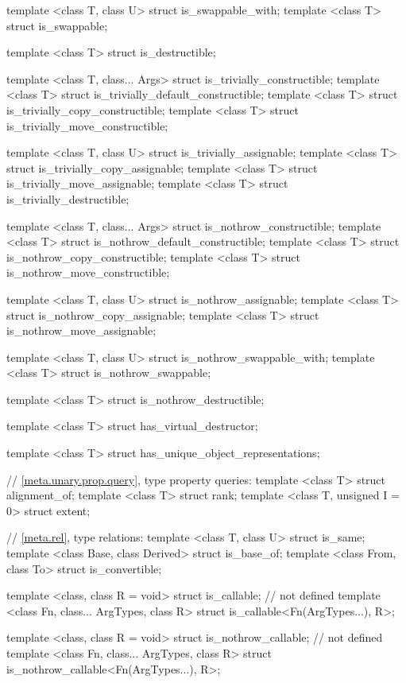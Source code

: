 \begin{codeblock}
{  template <class T, class U> struct is_swappable_with;
  template <class T> struct is_swappable;

  template <class T> struct is_destructible;

  template <class T, class... Args> struct is_trivially_constructible;
  template <class T> struct is_trivially_default_constructible;
  template <class T> struct is_trivially_copy_constructible;
  template <class T> struct is_trivially_move_constructible;

  template <class T, class U> struct is_trivially_assignable;
  template <class T> struct is_trivially_copy_assignable;
  template <class T> struct is_trivially_move_assignable;
  template <class T> struct is_trivially_destructible;

  template <class T, class... Args> struct is_nothrow_constructible;
  template <class T> struct is_nothrow_default_constructible;
  template <class T> struct is_nothrow_copy_constructible;
  template <class T> struct is_nothrow_move_constructible;

  template <class T, class U> struct is_nothrow_assignable;
  template <class T> struct is_nothrow_copy_assignable;
  template <class T> struct is_nothrow_move_assignable;

  template <class T, class U> struct is_nothrow_swappable_with;
  template <class T> struct is_nothrow_swappable;

  template <class T> struct is_nothrow_destructible;

  template <class T> struct has_virtual_destructor;

  template <class T> struct has_unique_object_representations;

  // \ref{meta.unary.prop.query}, type property queries:
  template <class T> struct alignment_of;
  template <class T> struct rank;
  template <class T, unsigned I = 0> struct extent;

  // \ref{meta.rel}, type relations:
  template <class T, class U> struct is_same;
  template <class Base, class Derived> struct is_base_of;
  template <class From, class To> struct is_convertible;

  template <class, class R = void> struct is_callable; // not defined
  template <class Fn, class... ArgTypes, class R>
    struct is_callable<Fn(ArgTypes...), R>;
     
  template <class, class R = void> struct is_nothrow_callable; // not defined
  template <class Fn, class... ArgTypes, class R>
    struct is_nothrow_callable<Fn(ArgTypes...), R>;

}
\end{codeblock}
